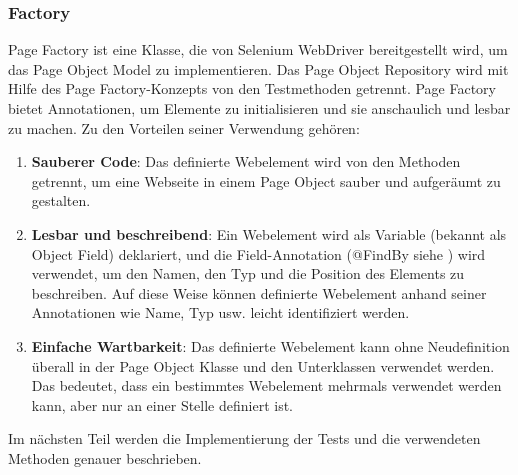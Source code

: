 \subsubsection{Factory}

Page Factory ist eine Klasse, die von Selenium WebDriver bereitgestellt
wird, um das Page Object Model zu implementieren. Das Page Object
Repository wird mit Hilfe des Page Factory-Konzepts von den Testmethoden
getrennt. Page Factory bietet Annotationen, um Elemente zu initialisieren und sie
anschaulich und lesbar zu machen. Zu den Vorteilen seiner Verwendung gehören:

\begin{enumerate}
    \item \textbf{Sauberer Code}: Das definierte Webelement wird von den Methoden
    getrennt, um eine Webseite in einem Page Object sauber und
    aufgeräumt zu gestalten.
    \item \textbf{Lesbar und beschreibend}: Ein Webelement wird als Variable
    (bekannt als Object Field) deklariert, und die Field-Annotation
    (@FindBy siehe ) wird verwendet, um den Namen, den Typ und
    die Position des Elements zu beschreiben. Auf diese Weise können
    definierte Webelement anhand seiner Annotationen wie Name, Typ
    usw. leicht identifiziert werden.
    \item \textbf{Einfache Wartbarkeit}: Das definierte Webelement kann ohne
    Neudefinition überall in der Page Object Klasse und den Unterklassen
    verwendet werden. Das bedeutet, dass ein bestimmtes Webelement
    mehrmals verwendet werden kann, aber nur an einer Stelle
    definiert ist.
\end{enumerate}


Im nächsten Teil werden die Implementierung der Tests und die verwendeten
Methoden genauer beschrieben.



